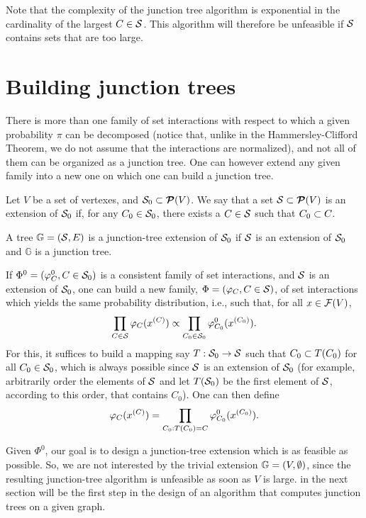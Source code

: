 Note that the complexity of the junction tree algorithm is exponential
in the cardinality of the largest $C\in {\mathcal S}$. This algorithm will
therefore be unfeasible if ${\mathcal S}$ contains sets that are too large.

\section{Building junction trees}

There is more than one family of set interactions with respect to
which a given probability $\pi$ can be decomposed (notice that, unlike
in the Hammersley-Clifford Theorem, we do not assume that the
interactions are normalized), and not all of them can be organized as
a junction tree. One can however extend any given family into a new one
on which one can build a junction tree.
\begin{definition}
\label{def:clique.ext}
Let $V$ be a set of vertexes, and ${\mathcal S}_0\subset {\bm{\mathcal P}({V})}$. We say that a
set ${\mathcal S} \subset {\bm{\mathcal P}({V})}$ is an extension of ${\mathcal S}_0$ if, for any $C_0\in
{\mathcal S}_0$, there exists a $C\in {\mathcal S}$ such that $C_0\subset C$.

A tree $\mathbb G = ({\mathcal S}, E)$ is a junction-tree extension of ${\mathcal S}_0$
if ${\mathcal S}$ is an extension of ${\mathcal S}_0$ and $\mathbb G$ is a junction tree.   
\end{definition}

If $\Phi^0 = (\varphi^0_C, C\in {\mathcal S}_0)$ is a consistent family of set
interactions, and ${\mathcal S}$ is an extension of ${\mathcal S}_0$, one can build a
new family, $\Phi = (\varphi_C, C\in {\mathcal S})$, of set interactions which
yields the same probability distribution, i.e., such that, for all
$x\in {\mathcal F}(V)$,  
\[
\prod_{C\in {\mathcal S}}\varphi_C(x^{(C)}) \propto \prod_{C_0\in
  {\mathcal S}_0}\varphi_{C_0}^0(x^{(C_0)}).
\]
For this, it suffices to build a mapping say $T: {\mathcal S}_0 \to {\mathcal S}$ such
that $C_0 \subset T(C_0)$ for all $C_0\in {\mathcal S}_0$, which is always
possible since ${\mathcal S}$ is an extension of ${\mathcal S}_0$ (for example,
arbitrarily order the elements of ${\mathcal S}$ and let $T({\mathcal S}_0)$ be the
first element of ${\mathcal S}$, according to this order, that contains
$C_0$).  One can then define 
\[
\varphi_C(x^{(C)}) = \prod_{C_0: T(C_0)=C} \varphi_{C_0}^0(x^{(C_0)}).
\] 

Given $\Phi^0$, our goal is to design a junction-tree extension which
is as feasible as possible. So, we are not interested by the trivial
extension $\mathbb G = (V, \emptyset)$, since the resulting junction-tree
algorithm is unfeasible as soon as $V$ is large.   in the next section will be the first step in the design of an algorithm that computes
junction trees on a given graph.

